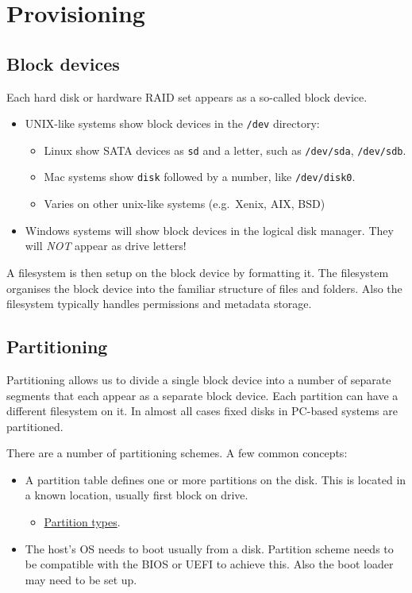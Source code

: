 \chapter{Provisioning}
\label{ch:provisioning}

\section{Block devices}
\label{sec:block-devices}

Each hard disk or hardware RAID set appears as a so-called block device.

\begin{itemize}
\item
  UNIX-like systems show block devices in the \texttt{/dev} directory:

  \begin{itemize}
  \item
    Linux show SATA devices as \texttt{sd} and a letter, such as
    \texttt{/dev/sda}, \texttt{/dev/sdb}.
  \item
    Mac systems show \texttt{disk} followed by a number, like
    \texttt{/dev/disk0}.
  \item
    Varies on other unix-like systems (e.g.~Xenix, AIX, BSD)
  \end{itemize}
\item
  Windows systems will show block devices in the logical disk manager.
  They will \emph{NOT} appear as drive letters!
\end{itemize}

A filesystem is then setup on the block device by formatting it. The
filesystem organises the block device into the familiar structure of
files and folders. Also the filesystem typically handles permissions and
metadata storage.

\section{Partitioning}\label{partitioning}

Partitioning allows us to divide a single block device into a number of
separate segments that each appear as a separate block device. Each
partition can have a different filesystem on it. In almost all cases
fixed disks in PC-based systems are partitioned.

There are a number of partitioning schemes. A few common concepts:

\begin{itemize}
\item
  A partition table defines one or more partitions on the disk. This is
  located in a known location, usually first block on drive.

  \begin{itemize}
  
  \item
    \href{https://en.wikipedia.org/wiki/Partition_type}{Partition
    types}.
  \end{itemize}
\item
  The host's OS needs to boot usually from a disk. Partition scheme
  needs to be compatible with the BIOS or UEFI to achieve this. Also the
  boot loader may need to be set up.
\end{itemize}

